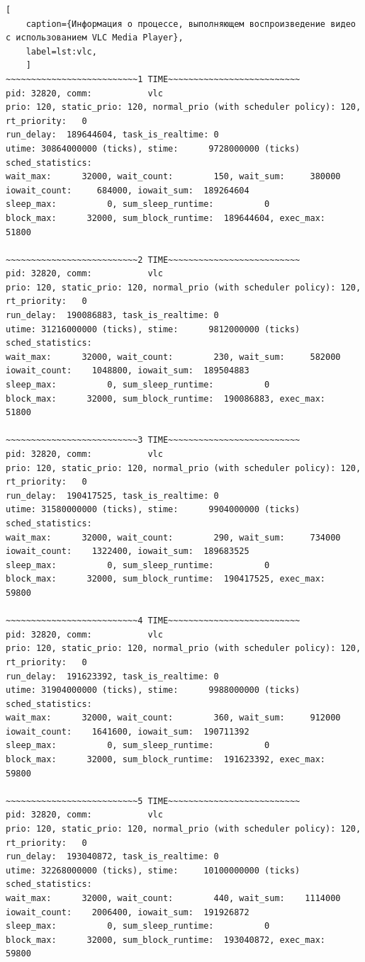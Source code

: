 \begin{lstlisting}[
	caption={Информация о процессе, выполняющем воспроизведение видео с использованием VLC Media Player},
	label=lst:vlc,
	]
~~~~~~~~~~~~~~~~~~~~~~~~~~1 TIME~~~~~~~~~~~~~~~~~~~~~~~~~~
pid: 32820, comm:           vlc
prio: 120, static_prio: 120, normal_prio (with scheduler policy): 120, 
rt_priority:   0
run_delay:  189644604, task_is_realtime: 0
utime: 30864000000 (ticks), stime:      9728000000 (ticks)
sched_statistics:
wait_max:      32000, wait_count:        150, wait_sum:     380000
iowait_count:     684000, iowait_sum:  189264604
sleep_max:          0, sum_sleep_runtime:          0
block_max:      32000, sum_block_runtime:  189644604, exec_max:      51800

~~~~~~~~~~~~~~~~~~~~~~~~~~2 TIME~~~~~~~~~~~~~~~~~~~~~~~~~~
pid: 32820, comm:           vlc
prio: 120, static_prio: 120, normal_prio (with scheduler policy): 120, 
rt_priority:   0
run_delay:  190086883, task_is_realtime: 0
utime: 31216000000 (ticks), stime:      9812000000 (ticks)
sched_statistics:
wait_max:      32000, wait_count:        230, wait_sum:     582000
iowait_count:    1048800, iowait_sum:  189504883
sleep_max:          0, sum_sleep_runtime:          0
block_max:      32000, sum_block_runtime:  190086883, exec_max:      51800

~~~~~~~~~~~~~~~~~~~~~~~~~~3 TIME~~~~~~~~~~~~~~~~~~~~~~~~~~
pid: 32820, comm:           vlc
prio: 120, static_prio: 120, normal_prio (with scheduler policy): 120, 
rt_priority:   0
run_delay:  190417525, task_is_realtime: 0
utime: 31580000000 (ticks), stime:      9904000000 (ticks)
sched_statistics:
wait_max:      32000, wait_count:        290, wait_sum:     734000
iowait_count:    1322400, iowait_sum:  189683525
sleep_max:          0, sum_sleep_runtime:          0
block_max:      32000, sum_block_runtime:  190417525, exec_max:      59800

~~~~~~~~~~~~~~~~~~~~~~~~~~4 TIME~~~~~~~~~~~~~~~~~~~~~~~~~~
pid: 32820, comm:           vlc
prio: 120, static_prio: 120, normal_prio (with scheduler policy): 120, 
rt_priority:   0
run_delay:  191623392, task_is_realtime: 0
utime: 31904000000 (ticks), stime:      9988000000 (ticks)
sched_statistics:
wait_max:      32000, wait_count:        360, wait_sum:     912000
iowait_count:    1641600, iowait_sum:  190711392
sleep_max:          0, sum_sleep_runtime:          0
block_max:      32000, sum_block_runtime:  191623392, exec_max:      59800

~~~~~~~~~~~~~~~~~~~~~~~~~~5 TIME~~~~~~~~~~~~~~~~~~~~~~~~~~
pid: 32820, comm:           vlc
prio: 120, static_prio: 120, normal_prio (with scheduler policy): 120, 
rt_priority:   0
run_delay:  193040872, task_is_realtime: 0
utime: 32268000000 (ticks), stime:     10100000000 (ticks)
sched_statistics:
wait_max:      32000, wait_count:        440, wait_sum:    1114000
iowait_count:    2006400, iowait_sum:  191926872
sleep_max:          0, sum_sleep_runtime:          0
block_max:      32000, sum_block_runtime:  193040872, exec_max:      59800
\end{lstlisting}

